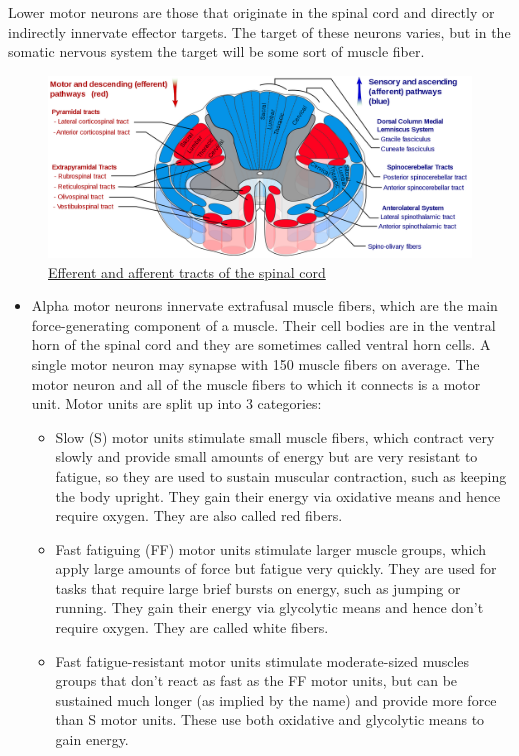 Lower motor neurons are those that originate in the spinal cord and directly or indirectly innervate effector targets. The target of these neurons varies, but in the somatic nervous system the target will be some sort of muscle fiber.



\begin{figure}

{\centering \includegraphics[width=0.7\linewidth]{./figures/cns/Spinal_cord_tracts_-_English} 

}

\caption{\href{https://commons.wikimedia.org/wiki/File:Spinal_cord_tracts_-_English.svg}{Efferent and afferent tracts of the spinal cord}}\label{fig:spinaltracts}
\end{figure}

\begin{itemize}
\item
  Alpha motor neurons innervate extrafusal muscle fibers, which are the main force-generating component of a muscle. Their cell bodies are in the ventral horn of the spinal cord and they are sometimes called ventral horn cells. A single motor neuron may synapse with 150 muscle fibers on average. The motor neuron and all of the muscle fibers to which it connects is a motor unit. Motor units are split up into 3 categories:

  \begin{itemize}
  \tightlist
  \item
    Slow (S) motor units stimulate small muscle fibers, which contract very slowly and provide small amounts of energy but are very resistant to fatigue, so they are used to sustain muscular contraction, such as keeping the body upright. They gain their energy via oxidative means and hence require oxygen. They are also called red fibers.
  \item
    Fast fatiguing (FF) motor units stimulate larger muscle groups, which apply large amounts of force but fatigue very quickly. They are used for tasks that require large brief bursts on energy, such as jumping or running. They gain their energy via glycolytic means and hence don't require oxygen. They are called white fibers.
  \item
    Fast fatigue-resistant motor units stimulate moderate-sized muscles groups that don't react as fast as the FF motor units, but can be sustained much longer (as implied by the name) and provide more force than S motor units. These use both oxidative and glycolytic means to gain energy.
  \end{itemize}
\end{itemize}

